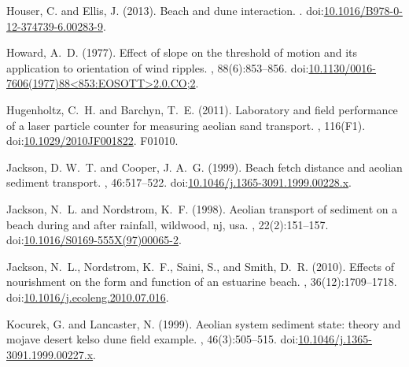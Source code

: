 \documentclass[preprint,12pt,authoryear,a4paper]{elsarticle}
\begin{document}
\begin{thebibliography}{}
Houser, C. and Ellis, J. (2013).
\newblock Beach and dune interaction.
.
\newblock
  doi:\href{http://dx.doi.org/10.1016/B978-0-12-374739-6.00283-9}{10.1016/B978-0-12-374739-6.00283-9}.

Howard, A.~D. (1977).
\newblock Effect of slope on the threshold of motion and its application to
  orientation of wind ripples.
, 88(6):853--856.
\newblock
  doi:\href{http://dx.doi.org/10.1130/0016-7606(1977)88<853:EOSOTT>2.0.CO;2}{10.1130/0016-7606(1977)88<853:EOSOTT>2.0.CO;2}.

Hugenholtz, C.~H. and Barchyn, T.~E. (2011).
\newblock Laboratory and field performance of a laser particle counter for
  measuring aeolian sand transport.
, 116(F1).
\newblock
  doi:\href{http://dx.doi.org/10.1029/2010JF001822}{10.1029/2010JF001822}.
\newblock F01010.

Jackson, D. W.~T. and Cooper, J. A.~G. (1999).
\newblock Beach fetch distance and aeolian sediment transport.
, 46:517--522.
\newblock
  doi:\href{http://dx.doi.org/10.1046/j.1365-3091.1999.00228.x}{10.1046/j.1365-3091.1999.00228.x}.

Jackson, N.~L. and Nordstrom, K.~F. (1998).
\newblock Aeolian transport of sediment on a beach during and after rainfall,
  wildwood, nj, usa.
, 22(2):151--157.
\newblock
  doi:\href{http://dx.doi.org/10.1016/S0169-555X(97)00065-2}{10.1016/S0169-555X(97)00065-2}.

Jackson, N.~L., Nordstrom, K.~F., Saini, S., and Smith, D.~R. (2010).
\newblock Effects of nourishment on the form and function of an estuarine
  beach.
, 36(12):1709--1718.
\newblock
  doi:\href{http://dx.doi.org/10.1016/j.ecoleng.2010.07.016}{10.1016/j.ecoleng.2010.07.016}.

Kocurek, G. and Lancaster, N. (1999).
\newblock Aeolian system sediment state: theory and mojave desert kelso dune
  field example.
, 46(3):505--515.
\newblock
  doi:\href{http://dx.doi.org/10.1046/j.1365-3091.1999.00227.x}{10.1046/j.1365-3091.1999.00227.x}.


\end{thebibliography}
\end{document}
